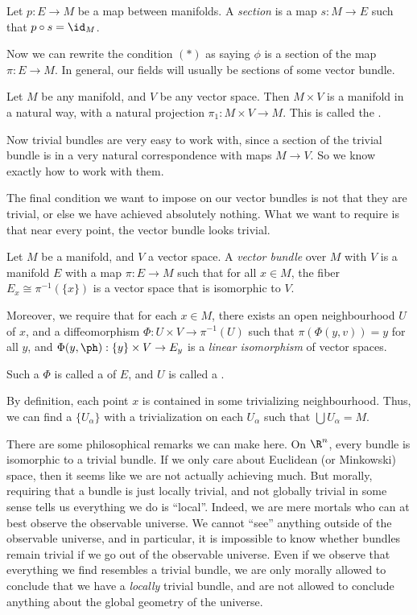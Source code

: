 \documentclass[a4paper]{article}
\begin{document}
\begin{defi}[Section]
  Let $p: E \to M$ be a map between manifolds. A \emph{section} is a map $s: M \to E$ such that $p \circ s = \id_M$.
\end{defi}
Now we can rewrite the condition $(*)$ as saying $\phi$ is a section of the map $\pi: E \to M$. In general, our fields will usually be sections of some vector bundle.

\begin{eg}
  Let $M$ be any manifold, and $V$ be any vector space. Then $M \times V$ is a manifold in a natural way, with a natural projection $\pi_1: M \times V \to M$. This is called the .
\end{eg}

Now trivial bundles are very easy to work with, since a section of the trivial bundle is in a very natural correspondence with maps $M \to V$. So we know exactly how to work with them.

The final condition we want to impose on our vector bundles is not that they are trivial, or else we have achieved absolutely nothing. What we want to require is that near every point, the vector bundle looks trivial.

\begin{defi}
  Let $M$ be a manifold, and $V$ a vector space. A \emph{vector bundle} over $M$ with  $V$ is a manifold $E$ with a map $\pi: E \to M$ such that for all $x \in M$, the fiber $E_x \cong \pi^{-1}(\{x\})$ is a vector space that is isomorphic to $V$.

  Moreover, we require that for each $x \in M$, there exists an open neighbourhood $U$ of $x$, and a diffeomorphism $\Phi: U \times V \to \pi^{-1}(U)$ such that $\pi(\Phi(y, v)) = y$ for all $y$, and $\Phi(y, \ph): \{y\} \times V \to E_y$ is a \emph{linear isomorphism} of vector spaces.

  Such a $\Phi$ is called a  of $E$, and $U$ is called a .
\end{defi}
By definition, each point $x$ is contained in some trivializing neighbourhood. Thus, we can find a  $\{U_\alpha\}$ with a trivialization on each $U_\alpha$ such that $\bigcup U_\alpha = M$.

There are some philosophical remarks we can make here. On $\R^n$, every bundle is isomorphic to a trivial bundle. If we only care about Euclidean (or Minkowski) space, then it seems like we are not actually achieving much. But morally, requiring that a bundle is just locally trivial, and not globally trivial in some sense tells us everything we do is ``local''. Indeed, we are mere mortals who can at best observe the observable universe. We cannot ``see'' anything outside of the observable universe, and in particular, it is impossible to know whether bundles remain trivial if we go out of the observable universe. Even if we observe that everything we find resembles a trivial bundle, we are only morally allowed to conclude that we have a \emph{locally} trivial bundle, and are not allowed to conclude anything about the global geometry of the universe.
\end{document}
